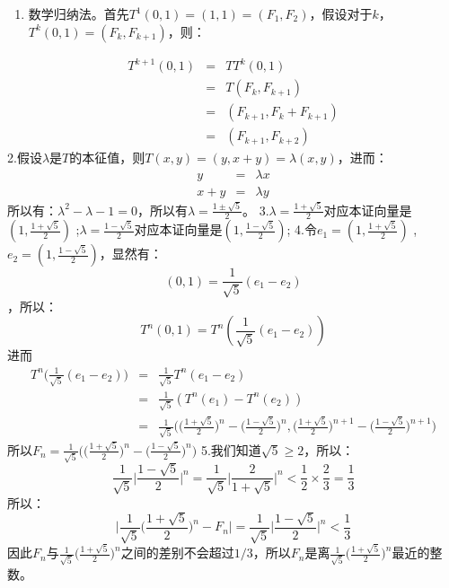 \documentclass[10pt,a4paper,UTF8]{article}
\begin{document}
\begin{answer}
\begin{enumerate}
\item 数学归纳法。首先\(T^{1}(0,1) = (1,1) = (F_{1},F_{2})\)，假设对于\(k\)，\(T^{k}(0,1) = (F_{k},F_{k+1})\)，则：
\end{enumerate}
\begin{eqnarray}
\label{eq:20}
T^{k+1}(0,1)&=&TT^{k}(0,1) \\
&=& T(F_{k},F_{k+1}) \\
&=& (F_{k+1}, F_{k}+F_{k+1}) \\
&=& (F_{k+1},F_{k+2})
\end{eqnarray}
2.假设\(\lambda\)是\(T\)的本征值，则\(T(x,y) = (y,x+y) = \lambda(x,y)\)，进而：
\begin{eqnarray}
\label{eq:21}
y&=&\lambda x \\
x+y &=& \lambda y
\end{eqnarray}
所以有：\(\lambda^{2} - \lambda - 1 = 0\)，所以有\(\lambda = \frac{1\pm \sqrt{5}}{2}\)。
3.\(\lambda = \frac{1+\sqrt{5}}{2}\)对应本证向量是\((1, \frac{1+\sqrt{5}}{2})\) ;\(\lambda = \frac{1-\sqrt{5}}{2}\)对应本证向量是\((1, \frac{1-\sqrt{5}}{2})\);
4.令\(e_{1} = (1, \frac{1+\sqrt{5}}{2})\) , \(e_{2} = (1, \frac{1-\sqrt{5}}{2})\)，显然有：\[(0,1) = \frac{1}{\sqrt{5}}(e_{1} - e_{2})\]，所以：
\begin{equation}
\label{eq:22}
T^{n}(0,1) = T^{n}(\frac{1}{\sqrt{5}} (e_{1} - e_{2}))
\end{equation}
进而
\begin{eqnarray}
\label{eq:23}
T^{n}\bigg(\frac{1}{\sqrt{5}} (e_{1} - e_{2})\bigg)&=&\frac{1}{\sqrt{5}}T^{n}(e_{1} - e_{2}) \\
&=& \frac{1}{\sqrt{5}} (T^{n}(e_{1}) - T^{n}(e_{2})) \\
&=& \frac{1}{\sqrt{5}} \bigg( \bigg(\frac{1+\sqrt{5}}{2}\bigg)^{n} - \bigg(\frac{1-\sqrt{5}}{2}\bigg)^{n}, \bigg(\frac{1+\sqrt{5}}{2}\bigg)^{n+1} - \bigg(\frac{1-\sqrt{5}}{2}\bigg)^{n+1} \bigg)
\end{eqnarray}
所以\(F_{n} = \frac{1}{\sqrt{5}} \bigg( \bigg(\frac{1+\sqrt{5}}{2}\bigg)^{n} - \bigg(\frac{1-\sqrt{5}}{2}\bigg)^{n}\bigg)\)
5.我们知道\(\sqrt{5} \ge 2\)，所以：
\begin{equation}
\label{eq:24}
\frac{1}{\sqrt{5}} \bigg| \frac{1-\sqrt{5}}{2} \bigg|^{n} = \frac{1}{\sqrt{5}} \bigg| \frac{2}{1+\sqrt{5}} \bigg|^{n} < \frac{1}{2}\times \frac{2}{3} = \frac{1}{3}
\end{equation}
所以：
\begin{equation}
\label{eq:25}
\bigg| \frac{1}{\sqrt{5}}  \bigg(\frac{1+\sqrt{5}}{2}\bigg)^{n} - F_{n} \bigg| = \frac{1}{\sqrt{5}} \bigg| \frac{1-\sqrt{5}}{2} \bigg|^{n} < \frac{1}{3}
\end{equation}
因此\(F_{n}\)与\(\frac{1}{\sqrt{5}}  \bigg(\frac{1+\sqrt{5}}{2}\bigg)^{n}\)之间的差别不会超过\(1/3\)，所以\(F_{n}\)是离\(\frac{1}{\sqrt{5}}  \bigg(\frac{1+\sqrt{5}}{2}\bigg)^{n}\)最近的整数。
\end{answer}
\end{document}
